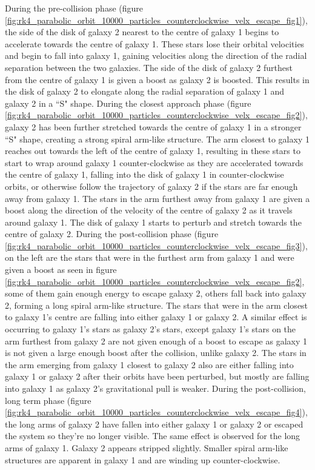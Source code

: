 \documentclass[10pt,letterpaper]{article}
\begin{document}
During the pre-collision phase (figure \ref{fig:rk4_parabolic_orbit_10000_particles_counterclockwise_velx_escape_fig1}), the side of the disk of galaxy 2 nearest to the centre of galaxy 1 begins to accelerate towards the centre of galaxy 1. These stars lose their orbital velocities and begin to fall into galaxy 1, gaining velocities along the direction of the radial separation between the two galaxies. The side of the disk of galaxy 2 furthest from the centre of galaxy 1 is given a boost as galaxy 2 is boosted. This results in the disk of galaxy 2 to elongate along the radial separation of galaxy 1 and galaxy 2 in a ``S" shape. During the closest approach phase (figure \ref{fig:rk4_parabolic_orbit_10000_particles_counterclockwise_velx_escape_fig2}), galaxy 2 has been further stretched towards the centre of galaxy 1 in a stronger ``S" shape, creating a strong spiral arm-like structure. The arm closest to galaxy 1 reaches out towards the left of the centre of galaxy 1, resulting in these stars to start to wrap around galaxy 1 counter-clockwise as they are accelerated towards the centre of galaxy 1, falling into the disk of galaxy 1 in counter-clockwise orbits, or otherwise follow the trajectory of galaxy 2 if the stars are far enough away from galaxy 1. The stars in the arm furthest away from galaxy 1 are given a boost along the direction of the velocity of the centre of galaxy 2 as it travels around galaxy 1. The disk of galaxy 1 starts to perturb and stretch towards the centre of galaxy 2. During the post-collision phase (figure \ref{fig:rk4_parabolic_orbit_10000_particles_counterclockwise_velx_escape_fig3}), on the left are the stars that were in the furthest arm from galaxy 1 and were given a boost as seen in figure \ref{fig:rk4_parabolic_orbit_10000_particles_counterclockwise_velx_escape_fig2}, some of them gain enough energy to escape galaxy 2, others fall back into galaxy 2, forming a long spiral arm-like structure. The stars that were in the arm closest to galaxy 1's centre are falling into either galaxy 1 or galaxy 2. A similar effect is occurring to galaxy 1's stars as galaxy 2's stars, except galaxy 1's stars on the arm furthest from galaxy 2 are not given enough of a boost to escape as galaxy 1 is not given a large enough boost after the collision, unlike galaxy 2. The stars in the arm emerging from galaxy 1 closest to galaxy 2 also are either falling into galaxy 1 or galaxy 2 after their orbits have been perturbed, but mostly are falling into galaxy 1 as galaxy 2's gravitational pull is weaker. During the post-collision, long term phase (figure \ref{fig:rk4_parabolic_orbit_10000_particles_counterclockwise_velx_escape_fig4}), the long arms of galaxy 2 have fallen into either galaxy 1 or galaxy 2 or escaped the system so they're no longer visible. The same effect is observed for the long arms of galaxy 1. Galaxy 2 appears stripped slightly. Smaller spiral arm-like structures are apparent in galaxy 1 and are winding up counter-clockwise.\\
\end{document}
